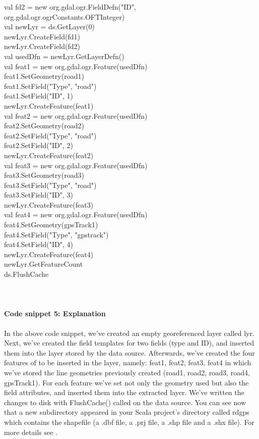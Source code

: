 \documentclass {article}
\begin{document}
val fd2 = new org.gdal.ogr.FieldDefn("ID", org.gdal.ogr.ogrConstants.OFTInteger)\\
val newLyr = ds.GetLayer(0)\\
newLyr.CreateField(fd1)\\
newLyr.CreateField(fd2)\\
val usedDfn = newLyr.GetLayerDefn()\\
val feat1 = new org.gdal.ogr.Feature(usedDfn)\\
feat1.SetGeometry(road1)\\
feat1.SetField("Type", "road")\\
feat1.SetField("ID", 1)\\
newLyr.CreateFeature(feat1)\\
val feat2 = new org.gdal.ogr.Feature(usedDfn)\\
feat2.SetGeometry(road2)\\
feat2.SetField("Type", "road")\\
feat2.SetField("ID", 2)\\
newLyr.CreateFeature(feat2)\\
val feat3 = new org.gdal.ogr.Feature(usedDfn)\\
feat3.SetGeometry(road3)\\
feat3.SetField("Type", "road")\\
feat3.SetField("ID", 3)\\
newLyr.CreateFeature(feat3)\\
val feat4 = new org.gdal.ogr.Feature(usedDfn)\\
feat4.SetGeometry(gpsTrack1)\\
feat4.SetField("Type", "gpstrack")\\
feat4.SetField("ID", 4)\\
newLyr.CreateFeature(feat4)\\
newLyr.GetFeatureCount \\
ds.FlushCache \\
\\
\\
\paragraph {Code snippet 5: Explanation}
In the above code snippet, we've created an empty georeferenced layer called lyr. Next, we've created the field templates for two fields (type and ID), and inserted them into the layer stored by the data source. 
Afterwards, we've created the four features of to be inserted in the layer, namely: feat1, feat2, feat3, feat4 in which we've stored the line geometries previously created (road1, road2, road3, road4, gpsTrack1). 
For each feature we've set not only the geometry used but also the field attributes, and inserted them into the extracted layer.
 We've written the changes to disk with FlushCache() called on the data source.
You can see now that a new subdirectory appeared in your Scala project's directory called rdgps which contains the shapefile (a .dbf file, a .prj file, a .shp file and a .shx file).
 For more details see \cite{garrard_geoprocessing_2016}.
\\
\\  
\end{document}
